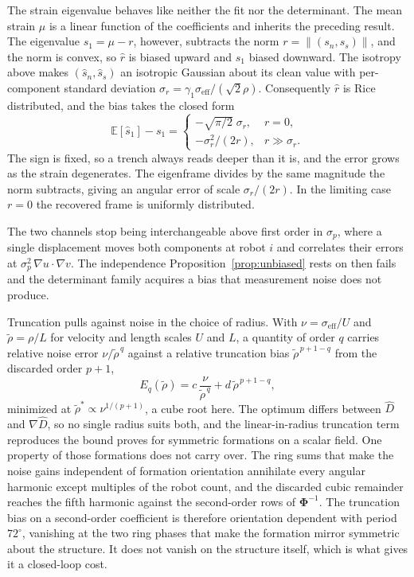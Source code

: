 \documentclass[lettersize,journal]{IEEEtran}
\begin{document}
The strain eigenvalue behaves like neither the fit nor the determinant.
The mean strain
$\mu$ is a linear function of the coefficients and inherits the
preceding result. The eigenvalue $s_1 = \mu - r$, however, subtracts the
norm $r = \lVert(s_n, s_s)\rVert$, and the norm is convex, so $\hat{r}$
is biased upward and $\hat{s}_1$ biased downward. The isotropy above
makes $(\hat{s}_n, \hat{s}_s)$ an isotropic Gaussian about its clean
value with per-component standard deviation $\sigma_r =
\gamma_1\sigma_{\mathrm{eff}}/(\sqrt{2}\rho)$. Consequently $\hat{r}$ is
Rice distributed, and the bias takes the closed form
\begin{equation}
    \mathbb{E}[\hat{s}_1] - s_1 =
    \begin{cases}
        -\sqrt{\pi/2}\;\sigma_r, & r = 0, \\[2pt]
        -\sigma_r^2 / (2r), & r \gg \sigma_r .
    \end{cases}
    \label{eq:s1_bias}
\end{equation}
The sign is fixed, so a trench always reads deeper than it is, and the
error grows as the strain degenerates. The eigenframe divides by the
same magnitude the norm subtracts, giving an angular error of scale
$\sigma_r/(2r)$. In the limiting case $r = 0$ the recovered frame is
uniformly distributed.

The two channels stop being interchangeable above first order in
$\sigma_p$, where a single displacement moves both components at robot
$i$ and correlates their errors at $\sigma_p^2\,\nabla u \cdot \nabla v$.
The independence Proposition~\ref{prop:unbiased} rests on then fails and
the determinant family acquires a bias that measurement noise does not
produce.

Truncation pulls against noise in the choice of radius. With $\nu =
\sigma_{\mathrm{eff}}/U$ and $\tilde{\rho} = \rho/L$ for velocity and
length scales $U$ and $L$, a quantity of order $q$ carries relative noise
error $\nu/\tilde{\rho}^{\,q}$ against a relative truncation bias
$\tilde{\rho}^{\,p+1-q}$ from the discarded order $p+1$,
\begin{equation}
    E_q(\tilde{\rho}) = c\,\frac{\nu}{\tilde{\rho}^{\,q}}
        + d\,\tilde{\rho}^{\,p+1-q},
    \label{eq:error_budget}
\end{equation}
minimized at $\tilde{\rho}^* \propto \nu^{1/(p+1)}$, a cube root here.
The optimum differs between $\hat{D}$ and $\nabla\hat{D}$, so no single
radius suits both, and the linear-in-radius truncation term reproduces
the bound \cite{6} proves for symmetric formations on a scalar field.
One property of those formations does not carry over. The ring sums that
make the noise gains independent of formation orientation annihilate
every angular harmonic except multiples of the robot count, and the
discarded cubic remainder reaches the fifth harmonic against the
second-order rows of $\boldsymbol{\Phi}^{-1}$. The truncation bias on a
second-order coefficient is therefore orientation dependent with period
$72^\circ$, vanishing at the two ring phases that make the formation
mirror symmetric about the structure. It does not vanish on the structure
itself, which is what gives it a closed-loop cost.
\end{document}
